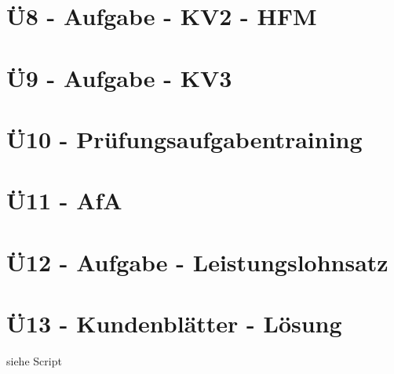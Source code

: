 \section{Ü8 - Aufgabe - KV2 - HFM}\label{sec:U08-Aufgabe-KV2-HFM}



\section{Ü9 - Aufgabe - KV3}\label{sec:U09-Aufgabe-KV3}



\section{Ü10 - Prüfungsaufgabentraining}\label{sec:U10-Pruefungsaufgabentraining}


 \newpage

\section{Ü11 - AfA}
 \newpage

\section{Ü12 - Aufgabe - Leistungslohnsatz}\label{sec:U12-Aufgabe-Leistungslohnsatz}

 \newpage

\section{Ü13 - Kundenblätter - Lösung}\label{sec:U13-Kundenblaetter-test-Loesung}
%

siehe Script %





